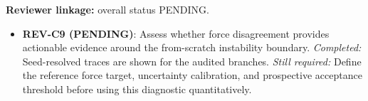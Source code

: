 \textbf{Reviewer linkage:} overall status PENDING.
\begin{itemize}[leftmargin=1.4em,noitemsep]
\item \textbf{REV-C9 (PENDING)}: Assess whether force disagreement provides actionable evidence around the from-scratch instability boundary. \emph{Completed:} Seed-resolved traces are shown for the audited branches. \emph{Still required:} Define the reference force target, uncertainty calibration, and prospective acceptance threshold before using this diagnostic quantitatively.
\end{itemize}
